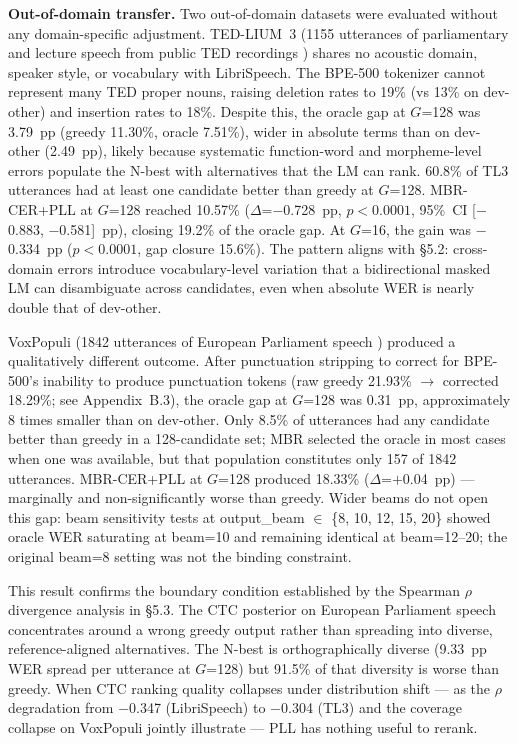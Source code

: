 \textbf{Out-of-domain transfer.} Two out-of-domain datasets were evaluated without any
domain-specific adjustment. TED-LIUM~3 (1155 utterances of parliamentary and lecture speech from
public TED recordings \cite{hernandez2018tedlium3}) shares no acoustic domain, speaker style, or
vocabulary with LibriSpeech. The BPE-500 tokenizer cannot represent many TED proper nouns,
raising deletion rates to 19\% (vs 13\% on dev-other) and insertion rates to 18\%. Despite this,
the oracle gap at $G$=128 was 3.79~pp (greedy 11.30\%, oracle 7.51\%), wider in absolute terms
than on dev-other (2.49~pp), likely because systematic function-word and morpheme-level errors populate
the N-best with alternatives that the LM can rank. 60.8\% of TL3 utterances had at least one
candidate better than greedy at $G$=128. MBR-CER+PLL at $G$=128 reached 10.57\%
($\Delta$=$-$0.728~pp, $p<0.0001$, 95\%\ CI [$-$0.883, $-$0.581]~pp), closing 19.2\% of the
oracle gap. At $G$=16, the gain was $-$0.334~pp ($p<0.0001$, gap closure
15.6\%). The pattern aligns with §5.2: cross-domain errors
introduce vocabulary-level variation that a bidirectional masked LM can disambiguate across
candidates, even when absolute WER is nearly double that of dev-other.

VoxPopuli (1842 utterances of European Parliament speech \cite{wang2021voxpopuli}) produced a
qualitatively different outcome. After punctuation stripping to correct for BPE-500's inability to
produce punctuation tokens (raw greedy 21.93\% $\to$ corrected 18.29\%; see Appendix~B.3), the
oracle gap at $G$=128 was 0.31~pp, approximately 8 times smaller than on dev-other. Only 8.5\%
of utterances had any candidate better than greedy in a 128-candidate set; MBR selected the oracle in most cases when one was available, but that population constitutes only 157 of 1842
utterances. MBR-CER+PLL at $G$=128 produced 18.33\%
($\Delta$=$+$0.04~pp) — marginally and non-significantly worse than greedy. Wider beams do not
open this gap: beam sensitivity tests at output\_beam $\in$ \{8, 10, 12, 15, 20\} showed oracle
WER saturating at beam=10 and remaining identical at beam=12--20; the original beam=8 setting was
not the binding constraint.

This result confirms the boundary condition established by the Spearman $\rho$ divergence analysis
in §5.3. The CTC posterior on European Parliament speech concentrates around a wrong greedy
output rather than spreading into diverse, reference-aligned alternatives. The N-best is
orthographically diverse (9.33~pp WER spread per utterance at $G$=128) but 91.5\% of that
diversity is worse than greedy. When CTC ranking quality collapses under distribution shift — as the $\rho$
degradation from $-$0.347 (LibriSpeech) to $-$0.304 (TL3) and the coverage collapse on
VoxPopuli jointly illustrate — PLL has nothing useful to rerank.

